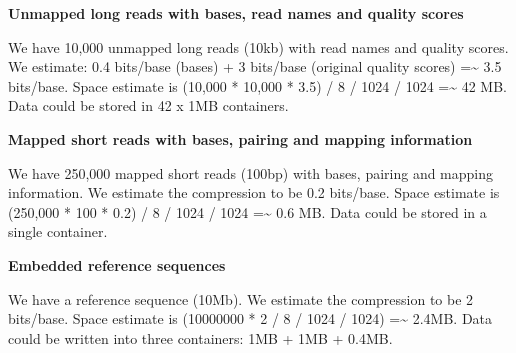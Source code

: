 \documentclass[a4paper]{article}
\begin{document}
\textbf{Unmapped long reads with bases, read names and quality scores}

We have 10,000 unmapped long reads (10kb) with read names and quality scores. We 
estimate: 0.4 bits/base (bases) + 3 bits/base (original quality scores) =\textasciitilde{} 
3.5 bits/base. Space estimate is (10,000 * 10,000 * 3.5) / 8 / 1024 / 1024 =\textasciitilde{} 
42 MB. Data could be stored in 42 x 1MB containers.

\textbf{Mapped short reads with bases, pairing and mapping information}

We have 250,000 mapped short reads (100bp) with bases, pairing and mapping information. 
We estimate the compression to be 0.2 bits/base. Space estimate is (250,000 * 100 
* 0.2) / 8 / 1024 / 1024 =\textasciitilde{} 0.6 MB. Data could be stored in a single 
container.

\textbf{Embedded reference sequences}

We have a reference sequence (10Mb). We estimate the compression to be 2 bits/base. 
Space estimate is (10000000 * 2 / 8 / 1024 / 1024) =\textasciitilde{} 2.4MB. Data 
could be written into three containers: 1MB + 1MB + 0.4MB.

\newpage
\end{document}
